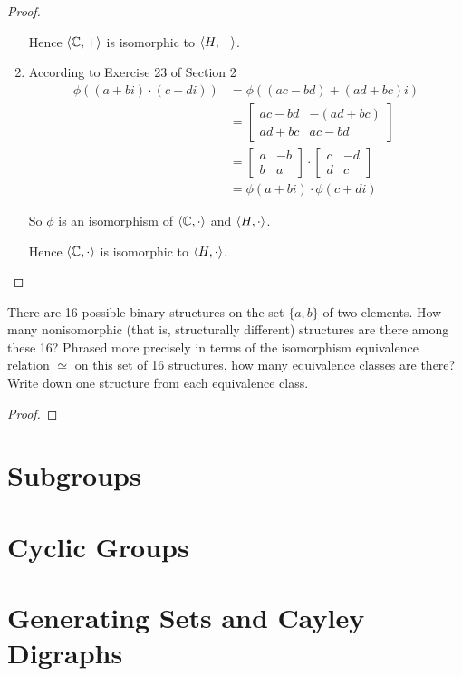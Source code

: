\begin{proof}
\begin{enumerate}[label={\textbf{\alph*.}},topsep=0pt,itemsep=0pt]
              Hence $\left\langle{\mathbb{C},+}\right\rangle$ is isomorphic to $\left\langle{H,+}\right\rangle$.
        \item According to Exercise 23 of Section 2
              \begin{align*}
                  \phi((a + bi) \cdot (c + di)) & = \phi((ac - bd) + (ad + bc)i)    \\
                                                & = \begin{bmatrix}
                                                        ac - bd & -(ad + bc) \\
                                                        ad + bc & ac - bd
                                                    \end{bmatrix}            \\
                                                & = \begin{bmatrix}
                                                        a & -b \\
                                                        b & a
                                                    \end{bmatrix} \cdot
                  \begin{bmatrix}
                      c & -d \\
                      d & c
                  \end{bmatrix}                                                    \\
                                                & = \phi(a + bi) \cdot \phi(c + di)
              \end{align*}

              So $\phi$ is an isomorphism of $\left\langle{\mathbb{C},\cdot}\right\rangle$ and $\left\langle{H,\cdot}\right\rangle$.

              Hence $\left\langle{\mathbb{C},\cdot}\right\rangle$ is isomorphic to $\left\langle{H,\cdot}\right\rangle$.
    \end{enumerate}

\end{proof}

\begin{exercise}
    There are 16 possible binary structures on the set $\{ a, b \}$ of two elements. How many nonisomorphic (that is, structurally different) structures are there among these 16? Phrased more precisely in terms of the isomorphism equivalence relation $\simeq$ on this set of 16 structures, how many equivalence classes are there? Write down one structure from each equivalence class.
\end{exercise}

\begin{proof}
\end{proof}

\section{Subgroups}

\section{Cyclic Groups}

\section{Generating Sets and Cayley Digraphs}

